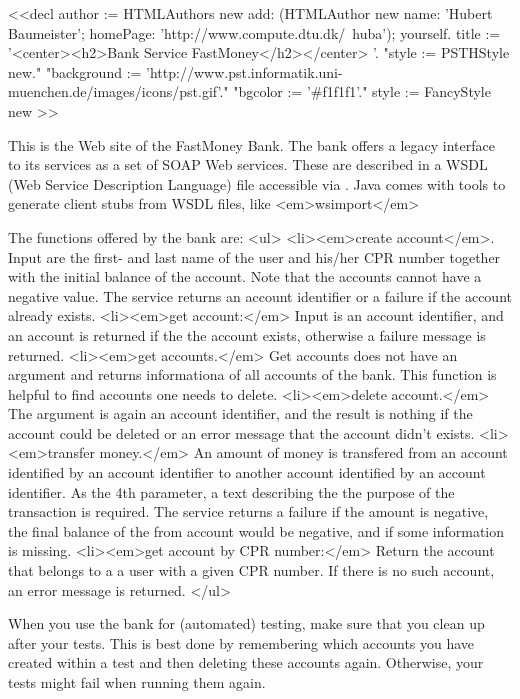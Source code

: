 <<decl
author := HTMLAuthors new add: (HTMLAuthor new name: 'Hubert Baumeister'; homePage: 'http://www.compute.dtu.dk/~huba'); yourself.
title := '<center><h2>Bank Service FastMoney</h2></center> '.
"style := PSTHStyle new."
"background := 'http://www.pst.informatik.uni-muenchen.de/images/icons/pst.gif'."
"bgcolor := '#f1f1f1'."
style := FancyStyle new
>>

This is the Web site of the FastMoney Bank. The bank offers a legacy interface to its services as a set of SOAP Web services. These are described in a WSDL (Web Service Description Language) file accessible via . Java comes with tools to generate client stubs from WSDL files, like <em>wsimport</em>

The functions offered by the bank are:
<ul>
   <li><em>create account</em>. Input are the first- and last name of the user and his/her CPR number together with the initial balance of the account. Note that the accounts cannot have a negative value. The service returns an account identifier or a failure if the account already exists.
   <li><em>get account:</em> Input is an account identifier, and an account is returned if the the account exists, otherwise a failure message is returned.
   <li><em>get accounts.</em> Get accounts does not have an argument and returns informationa of all accounts of the bank. This function is helpful to find accounts one needs to delete.
   <li><em>delete account.</em> The argument is again an account identifier, and the result is nothing if the account could be deleted or an error message that the account didn't exists.
   <li><em>transfer money.</em> An amount of money is transfered from an account identified by an account identifier to another account identified by an account identifier. As the 4th parameter, a text describing the the purpose of the transaction is required. The service returns a failure if the amount is negative, the final balance of the from account would be negative, and if some information is missing.
   <li><em>get account by CPR number:</em> Return the account that belongs to a a user with a given CPR number. If there is no such account, an error message is returned.
</ul>

When you use the bank for (automated) testing, make sure that you clean up after your tests. This is best done by remembering which accounts you have created within a test and then deleting these accounts again. Otherwise, your tests might fail when running them again.


